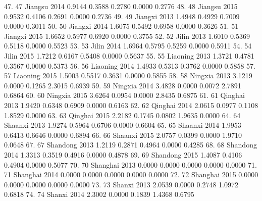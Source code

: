 47. {\VBAR}  47          Jiangsu   2014   0.9144   0.3588   0.2780   0.0000   0.2776 {\VBAR}
48. {\VBAR}  48          Jiangsu   2015   0.9532   0.4106   0.2691   0.0000   0.2736 {\VBAR}
49. {\VBAR}  49          Jiangxi   2013   1.4948   0.4929   0.7009   0.0000   0.3011 {\VBAR}
50. {\VBAR}  50          Jiangxi   2014   1.6075   0.5492   0.6958   0.0000   0.3626 {\VBAR}
51. {\VBAR}  51          Jiangxi   2015   1.6652   0.5977   0.6920   0.0000   0.3755 {\VBAR}
52. {\VBAR}  52            Jilin   2013   1.6010   0.5369   0.5118   0.0000   0.5523 {\VBAR}
53. {\VBAR}  53            Jilin   2014   1.6964   0.5795   0.5259   0.0000   0.5911 {\VBAR}
54. {\VBAR}  54            Jilin   2015   1.7212   0.6167   0.5408   0.0000   0.5637 {\VBAR}
55. {\VBAR}  55         Liaoning   2013   1.3721   0.4781   0.3567   0.0000   0.5373 {\VBAR}
56. {\VBAR}  56         Liaoning   2014   1.4933   0.5313   0.3762   0.0000   0.5858 {\VBAR}
57. {\VBAR}  57         Liaoning   2015   1.5003   0.5517   0.3631   0.0000   0.5855 {\VBAR}
58. {\VBAR}  58          Ningxia   2013   3.1219   0.0000   0.1265   2.3015   0.6939 {\VBAR}
59. {\VBAR}  59          Ningxia   2014   3.4828   0.0000   0.0072   2.7891   0.6864 {\VBAR}
60. {\VBAR}  60          Ningxia   2015   3.6264   0.0954   0.0000   2.8435   0.6875 {\VBAR}
61. {\VBAR}  61          Qinghai   2013   1.9420   0.6348   0.6909   0.0000   0.6163 {\VBAR}
62. {\VBAR}  62          Qinghai   2014   2.0615   0.0977   0.1108   1.8529   0.0000 {\VBAR}
63. {\VBAR}  63          Qinghai   2015   2.2182   0.1745   0.0802   1.9635   0.0000 {\VBAR}
64. {\VBAR}  64          Shaanxi   2013   1.9274   0.5964   0.6706   0.0000   0.6604 {\VBAR}
65. {\VBAR}  65          Shaanxi   2014   1.9953   0.6413   0.6646   0.0000   0.6894 {\VBAR}
66. {\VBAR}  66          Shaanxi   2015   2.0757   0.0399   0.0000   1.9710   0.0648 {\VBAR}
67. {\VBAR}  67         Shandong   2013   1.2119   0.2871   0.4964   0.0000   0.4285 {\VBAR}
68. {\VBAR}  68         Shandong   2014   1.3313   0.3519   0.4916   0.0000   0.4878 {\VBAR}
69. {\VBAR}  69         Shandong   2015   1.4087   0.4106   0.4904   0.0000   0.5077 {\VBAR}
70. {\VBAR}  70         Shanghai   2013   0.0000   0.0000   0.0000   0.0000   0.0000 {\VBAR}
71. {\VBAR}  71         Shanghai   2014   0.0000   0.0000   0.0000   0.0000   0.0000 {\VBAR}
72. {\VBAR}  72         Shanghai   2015   0.0000   0.0000   0.0000   0.0000   0.0000 {\VBAR}
73. {\VBAR}  73           Shanxi   2013   2.0539   0.0000   0.2748   1.0972   0.6818 {\VBAR}
74. {\VBAR}  74           Shanxi   2014   2.3002   0.0000   0.1839   1.4368   0.6795 {\VBAR}
